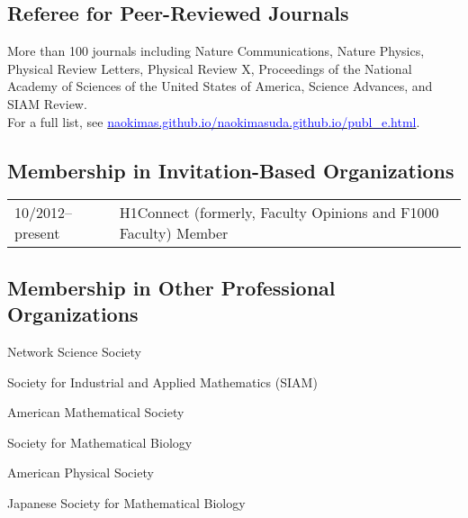 \documentclass[11pt,letter]{article}
\renewenvironment{itemize}{
  \begin{list}{}{
    \setlength{\leftmargin}{1.5em}
    \setlength{\itemsep}{0.25em}
    \setlength{\parskip}{0pt}
    \setlength{\parsep}{0.25em}
  }
}{
  \end{list}
}
\begin{document}
\subsection*{\bf \normalsize Referee for Peer-Reviewed Journals}
More than 100 journals including
Nature Communications,
Nature Physics,
Physical Review Letters,
Physical Review X,
Proceedings of the National Academy of Sciences of the United States of America,
Science Advances, and
SIAM Review.\\
For a full list, see \href{https://naokimas.github.io/naokimasuda.github.io/publ_e.html#referee}{\textcolor{blue}{naokimas.github.io/naokimasuda.github.io/publ\_e.html}}.



\subsection*{\bf \normalsize Membership in Invitation-Based Organizations}

\begin{tabular}{ll}
10/2012--present & H1Connect (formerly, Faculty Opinions and F1000 Faculty) Member
\end{tabular}

\subsection*{\bf \normalsize Membership in Other Professional Organizations}

\begin{itemize}
\item Network Science Society
\item Society for Industrial and Applied Mathematics (SIAM)
\item American Mathematical Society
\item Society for Mathematical Biology
\item American Physical Society
\item Japanese Society for Mathematical Biology
\end{itemize}
\end{document}
